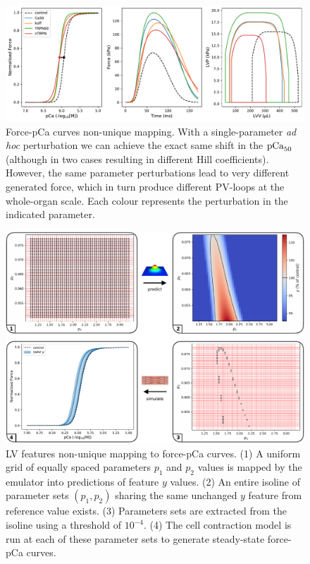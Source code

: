 \begin{figure}[!ht]
    \myfloatalign
    \includegraphics[width=\textwidth]{figures/chapter08/same_shift_FpCa_1param_different_Ts_and_PVloops.pdf}
    \caption{Force-pCa curves non-unique mapping. With a single-parameter \textit{ad hoc} perturbation we can achieve the exact same shift in the $\textrm{pCa}_{50}$ (although in two cases resulting in different Hill coefficients). However, the same parameter perturbations lead to very different generated force, which in turn produce different PV-loops at the whole-organ scale. Each colour represents the perturbation in the indicated parameter.}
    \label{fig:oneparamsameshift}
\end{figure}


\begin{figure}[!ht]
    \myfloatalign
    \includegraphics[width=\textwidth]{figures/chapter08/LVfeat_to_FpCa_schematic.pdf}
    \caption{LV features non-unique mapping to force-pCa curves. (1) A uniform grid of equally spaced parameters $p_1$ and $p_2$ values is mapped by the emulator into predictions of feature $y$ values. (2) An entire isoline of parameter sets $(p_1,p_2)$ sharing the same unchanged $y$ feature from reference value exists. (3) Parameters sets are extracted from the isoline using a threshold of $10^{-4}$. (4) The cell contraction model is run at each of these parameter sets to generate steady-state force-pCa curves.}
    \label{fig:gridmappingschematic}
\end{figure}



